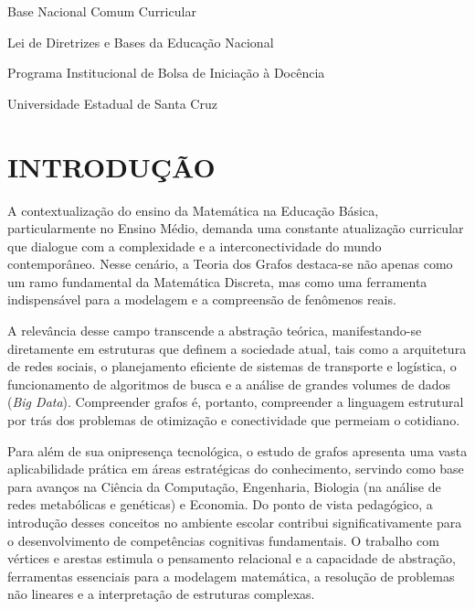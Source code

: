 \documentclass[
  12pt,
  oneside,
  a4paper,
  english,
  brazilian
  ]{abntex2}
\theoremstyle{definition}
\begin{document}
\listoffigures*
\cleardoublepage

\begin{siglas}
  \item[BNCC] Base Nacional Comum Curricular
  \item[LDB]  Lei de Diretrizes e Bases da Educação Nacional
  \item[PIBID] Programa Institucional de Bolsa de Iniciação à Docência
  \item[UESC] Universidade Estadual de Santa Cruz
\end{siglas}

\tableofcontents*
\cleardoublepage

\textual

\chapter{INTRODUÇÃO}

A contextualização do ensino da Matemática na Educação Básica, particularmente
no Ensino Médio, demanda uma constante atualização curricular que dialogue com a
complexidade e a interconectividade do mundo contemporâneo. Nesse cenário, a
Teoria dos Grafos destaca-se não apenas como um ramo fundamental da Matemática
Discreta, mas como uma ferramenta indispensável para a modelagem e a compreensão
de fenômenos reais.

A relevância desse campo transcende a abstração teórica, manifestando-se
diretamente em estruturas que definem a sociedade atual, tais como a arquitetura
de redes sociais, o planejamento eficiente de sistemas de transporte e logística,
o funcionamento de algoritmos de busca e a análise de grandes volumes de dados
(\textit{Big Data}). Compreender grafos é, portanto, compreender a linguagem
estrutural por trás dos problemas de otimização e conectividade que permeiam o
cotidiano.

Para além de sua onipresença tecnológica, o estudo de grafos apresenta uma vasta
aplicabilidade prática em áreas estratégicas do conhecimento, servindo como base
para avanços na Ciência da Computação, Engenharia, Biologia (na análise de redes
metabólicas e genéticas) e Economia. Do ponto de vista pedagógico, a introdução
desses conceitos no ambiente escolar contribui significativamente para o
desenvolvimento de competências cognitivas fundamentais. O trabalho com vértices
e arestas estimula o pensamento relacional e a capacidade de abstração,
ferramentas essenciais para a modelagem matemática, a resolução de problemas não
lineares e a interpretação de estruturas complexas.
\end{document}
